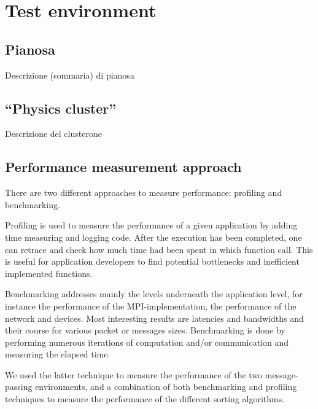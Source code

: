 \section{Test environment}

\subsection{Pianosa}
Descrizione (sommaria) di pianosa

\subsection{``Physics cluster''}
Descrizione del clusterone

\subsection{Performance measurement approach}
There are two different approaches to measure performance: profiling and benchmarking.

Profiling is used to measure the performance of a given application by adding time measuring and logging code. After the execution has been completed, one can retrace and check how much time had been spent in which function call. This is useful for application developers to find potential bottlenecks and inefficient implemented functions.

Benchmarking addresses mainly the levels underneath the application level, for instance the performance
of the MPI-implementation, the performance of the network and devices. Most interesting results are latencies and bandwidths and their course for various packet or messages sizes. Benchmarking is done by performing numerous iterations of computation and/or communication and measuring the elapsed time.

We used the latter technique to measure the performance of the two message-passing environments, and a combination of both benchmarking and profiling techniques to measure the performance of the different sorting algorithms.

